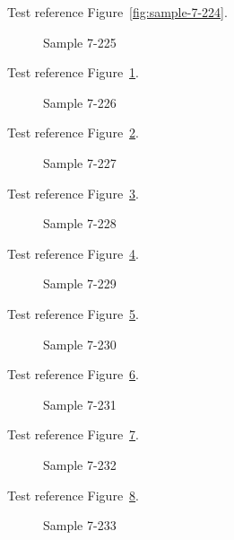 Test reference Figure~\ref{fig:sample-7-224}.

\begin{figure}[tbhp]
\caption{Sample 7-225}
\label{fig:sample-7-225}
\end{figure}

Test reference Figure~\ref{fig:sample-7-225}.

\begin{figure}[tbhp]
\caption{Sample 7-226}
\label{fig:sample-7-226}
\end{figure}

Test reference Figure~\ref{fig:sample-7-226}.

\begin{figure}[tbhp]
\caption{Sample 7-227}
\label{fig:sample-7-227}
\end{figure}

Test reference Figure~\ref{fig:sample-7-227}.

\begin{figure}[tbhp]
\caption{Sample 7-228}
\label{fig:sample-7-228}
\end{figure}

Test reference Figure~\ref{fig:sample-7-228}.

\begin{figure}[tbhp]
\caption{Sample 7-229}
\label{fig:sample-7-229}
\end{figure}

Test reference Figure~\ref{fig:sample-7-229}.

\begin{figure}[tbhp]
\caption{Sample 7-230}
\label{fig:sample-7-230}
\end{figure}

Test reference Figure~\ref{fig:sample-7-230}.

\begin{figure}[tbhp]
\caption{Sample 7-231}
\label{fig:sample-7-231}
\end{figure}

Test reference Figure~\ref{fig:sample-7-231}.

\begin{figure}[tbhp]
\caption{Sample 7-232}
\label{fig:sample-7-232}
\end{figure}

Test reference Figure~\ref{fig:sample-7-232}.

\begin{figure}[tbhp]
\caption{Sample 7-233}
\label{fig:sample-7-233}
\end{figure}

